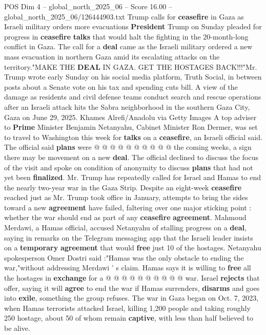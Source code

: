 \begin{textsample}{POS Dim 4 – global\_north\_2025\_06 – Score 16.00 – global\_north\_2025\_06/126444903.txt}  \label{ex:f4_pos_390}
Trump calls for \textbf{ceasefire} in Gaza as Israeli military orders more evacuations \textbf{President} Trump on Sunday pleaded for progress in \textbf{ceasefire} \textbf{talks} that would halt the fighting in the 20-month-long conflict in Gaza.
The call for a \textbf{deal} came as the Israeli military ordered a new mass evacuation in northern Gaza amid its escalating attacks on the territory."MAKE THE \textbf{DEAL} IN GAZA.
GET THE HOSTAGES BACK!!!"Mr.
Trump wrote early Sunday on his social media platform, Truth Social, in between posts about a Senate vote on his tax and spending cuts bill.
A view of the damage as residents and civil defense teams conduct search and rescue operations after an Israeli attack hits the Sabra neighborhood in the southern Gaza City, Gaza on June 29, 2025.
Khames Alrefi/Anadolu via Getty Images A top adviser to \textbf{Prime} Minister Benjamin Netanyahu, Cabinet Minister Ron Dermer, was set to travel to Washington this week for \textbf{talks} on a \textbf{ceasefire}, an Israeli official said.
The official said \textbf{plans} were @ @ @ @ @ @ @ @ @ @ the coming weeks, a sign there may be movement on a new \textbf{deal}.
The official declined to discuss the focus of the visit and spoke on condition of anonymity to discuss \textbf{plans} that had not yet been \textbf{finalized}.
Mr.
Trump has repeatedly called for Israel and Hamas to end the nearly two-year war in the Gaza Strip.
Despite an eight-week \textbf{ceasefire} reached just as Mr.
Trump took office in January, attempts to bring the sides toward a new \textbf{agreement} have failed, faltering over one major sticking point : whether the war should end as part of any \textbf{ceasefire} \textbf{agreement}.
Mahmoud Merdawi, a Hamas official, accused Netanyahu of stalling progress on a \textbf{deal}, saying in remarks on the Telegram messaging app that the Israeli leader insists on a \textbf{temporary} \textbf{agreement} that would \textbf{free} just 10 of the hostages.
Netanyahu spokesperson Omer Dostri said :"Hamas was the only obstacle to ending the war,"without addressing Merdawi ' s claim.
Hamas says it is willing to \textbf{free} all the hostages in \textbf{exchange} for a @ @ @ @ @ @ @ @ @ @ war.
Israel \textbf{rejects} that offer, saying it will \textbf{agree} to end the war if Hamas surrenders, \textbf{disarms} and goes into \textbf{exile}, something the group refuses.
The war in Gaza began on Oct. 7, 2023, when Hamas terrorists attacked Israel, killing 1,200 people and taking roughly 250 hostage, about 50 of whom remain \textbf{captive}, with less than half believed to be alive.

\end{textsample}
